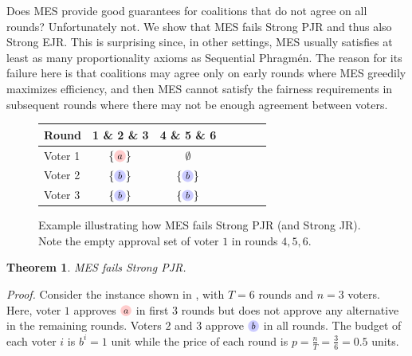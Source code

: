 \documentclass[10pt]{scrartcl}
\theoremstyle{plain}
\newtheorem{theorem}{Theorem}[section]
\theoremstyle{definition}
\newcommand{\alternativea}{\tikz[baseline=-3pt,transform shape,scale=0.85]{\node[text height=6pt,inner sep=1pt,fill=red!20,    circle,minimum width=12pt] (x) {$a$};}}
\newcommand{\alternativeb}{\tikz[baseline=-3pt,transform shape,scale=0.85]{\node[text height=6pt,inner sep=1pt,fill=blue!20,   circle,minimum width=12pt] (x) {$b$};}}
\begin{document}
Does MES provide good guarantees for coalitions that do not agree on all rounds? Unfortunately not. We show that MES fails Strong PJR and thus also Strong EJR. This is surprising since, in other settings, MES usually satisfies at least as many proportionality axioms as Sequential Phragm\'en. The reason for its failure here is that coalitions may agree only on early rounds where MES greedily maximizes efficiency, and then MES cannot satisfy the fairness requirements in subsequent rounds where there may not be enough agreement between voters.

\begin{figure}
	\vspace{-12pt}	
	\centering
	\scalebox{0.9}
	{\setlength{\tabcolsep}{4pt}
		\begin{tabular}{lcccccc}
			\toprule
			Round & 1 \& 2 \& 3 & 4 \& 5 \& 6 \\
			\midrule
			Voter 1 & $\{\alternativea\}$ & $\emptyset$ \\
			Voter 2 & $\{\alternativeb\}$ &  $\{\alternativeb\}$ \\
			Voter 3 & $\{\alternativeb\}$ &  $\{\alternativeb\}$ \\
			\bottomrule
	\end{tabular}}
	\caption{Example illustrating how MES fails Strong PJR (and Strong JR). Note the empty approval set of voter $1$ in rounds $4, 5, 6$.}
	\label{fig:MESfails}
\end{figure}

\begin{theorem}
	MES fails Strong PJR.
	\label{thm:MESfails}
\end{theorem}

\noindent
\emph{Proof.}\: Consider the instance shown in , with $T = 6$ rounds and $n = 3$ voters. Here, voter $1$ approves $\alternativea$ in first $3$ rounds but does not approve any alternative in the remaining rounds. Voters $2$ and $3$ approve $\alternativeb$ in all rounds. 
The budget of each voter $i$ is $b^i = 1$ unit while the price of each round is $p = \frac{n}{T} = \frac36 = 0.5$ units. 
\end{document}
